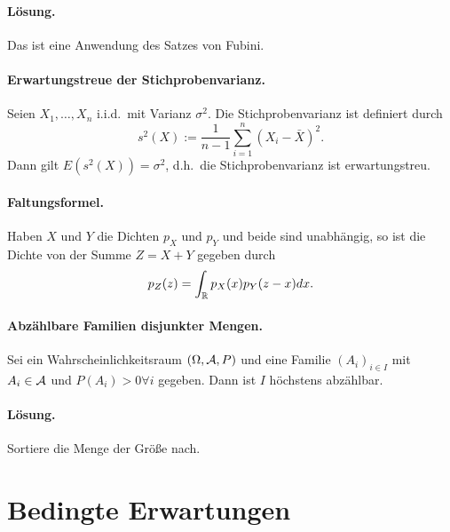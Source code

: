 \paragraph*{Lösung.} Das ist eine Anwendung des Satzes von Fubini.

\paragraph{Erwartungstreue der Stichprobenvarianz. } 
Seien $X_1,\ldots,X_n$ i.i.d.\ mit Varianz $\sigma^2$. Die Stichprobenvarianz
ist definiert durch
\begin{equation*}
    s^2(X) := \frac{1}{n-1} \sum_{i=1}^{n} (X_i - \bar X)^2.
\end{equation*}
Dann gilt $E(s^2(X)) = \sigma^2$, d.h.~die Stichprobenvarianz ist erwartungstreu.


\paragraph{Faltungsformel. } Haben $X$ und $Y$ die Dichten $p_X$ und $p_Y$ und beide
sind unabhängig, so ist die Dichte von der Summe $Z=X+Y$ gegeben durch
\begin{equation*}
    p_Z(z) = \int_{\mathbb R}^{} p_X(x)p_Y(z-x) dx.
\end{equation*}%


\paragraph{Abzählbare Familien disjunkter Mengen.} Sei ein Wahrscheinlichkeitsraum
$(\Omega, \mathcal A, P)$ und eine Familie $(A_i)_{i\in I}$ mit $A_i \in \mathcal A$ und
$P(A_i)>0 \forall i$ gegeben. Dann ist $I$ höchstens abzählbar. 
\paragraph*{Lösung.} Sortiere die Menge der Größe nach. 



\section{Bedingte Erwartungen}



